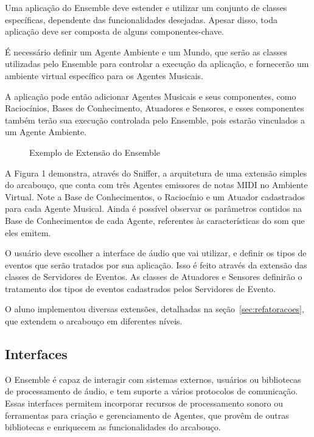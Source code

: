 \documentclass[a4paper, 11pt, twoside]{article}
\begin{document}
\begin{multicols}{2}
Uma aplicação do Ensemble deve estender e utilizar um conjunto de classes
específicas, dependente das funcionalidades desejadas. Apesar disso,
toda aplicação deve ser composta de alguns componentes-chave. 

É necessário definir um Agente Ambiente e um Mundo, que serão as classes
utilizadas pelo Ensemble para controlar a execução da aplicação,
e fornecerão um ambiente virtual específico para os Agentes Musicais.

A aplicação pode então adicionar Agentes Musicais e seus componentes, 
como Raciocínios, Bases de Conhecimento, Atuadores e Sensores, e esses
componentes também terão sua execução controlada pelo Ensemble, pois
estarão vinculados a um Agente Ambiente.

\begin{figure}[H]
  \centering
  \caption{Exemplo de Extensão do Ensemble}
  \label{fig2}
\end{figure}

A Figura 1 demonstra, através do Sniffer, a arquitetura de uma extensão simples
do arcabouço, que conta com três Agentes emissores de notas
MIDI no Ambiente Virtual. Note a Base de Conhecimentos, 
o Raciocínio e um Atuador cadastrados
para cada Agente Musical. Ainda é possível observar os
parâmetros contidos na Base de Conhecimentos de cada
Agente, referentes às características do som que eles emitem.

O usuário deve escolher a interface de áudio que vai utilizar,
e definir os tipos de eventos que serão tratados por sua aplicação.
Isso é feito através da extensão das classes de Servidores de Eventos.
As classes de Atuadores e Sensores definirão o tratamento dos tipos
de eventos cadastrados pelos Servidores de Evento.

O aluno implementou diversas extensões, detalhadas na seção~\ref{sec:refatoracoes},  que extendem
o arcabouço em diferentes níveis. 

\subsection{Interfaces}

O Ensemble é capaz de interagir com sistemas externos, usuários ou 
bibliotecas de processamento de áudio, e tem suporte a vários protocolos de 
comunicação. Essas interfaces permitem incorporar recursos de processamento sonoro 
ou ferramentas para criação e gerenciamento de Agentes, que provêm de outras 
bibliotecas e enriquecem as funcionalidades do arcabouço.


\end{multicols}
\end{document}
